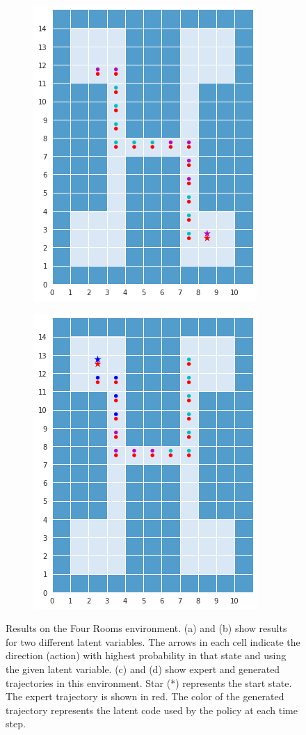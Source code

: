 \documentclass{article} %
\begin{document}
\begin{figure}[t]
\begin{subfigure}{0.24\columnwidth}
    \caption{}
    \end{subfigure}
    \begin{subfigure}{0.24\columnwidth}
    \centering
    \includegraphics[scale=0.2]{figures/path2.png}
    \caption{}
    \end{subfigure}%
    \begin{subfigure}{0.24\columnwidth}
    \centering
    \includegraphics[scale=0.2]{figures/path4.png}
    \caption{}
    \end{subfigure}%
    
\caption{Results on the Four Rooms environment. (a) and (b) show results for two different latent variables. The arrows in each cell indicate the direction (action) with highest probability in that state and using the given latent variable. (c) and (d) show expert and generated trajectories in this environment. Star (*) represents the start state. The expert trajectory is shown in red. The color of the generated trajectory represents the latent code used by the policy at each time step.}
\label{results_exp1}
\vspace{-0.3cm}
\end{figure}
\end{document}

